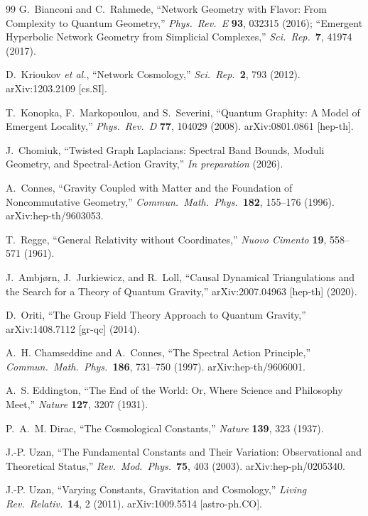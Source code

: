 \documentclass[11pt,a4paper]{article}
\theoremstyle{plain}
\theoremstyle{definition}
\begin{document}
\begin{thebibliography}{99}
G.~Bianconi and C.~Rahmede, ``Network Geometry with Flavor: From Complexity to Quantum Geometry,'' \textit{Phys.\ Rev.\ E} \textbf{93}, 032315 (2016); ``Emergent Hyperbolic Network Geometry from Simplicial Complexes,'' \textit{Sci.\ Rep.}\ \textbf{7}, 41974 (2017).

D.~Krioukov \textit{et al.}, ``Network Cosmology,'' \textit{Sci.\ Rep.}\ \textbf{2}, 793 (2012). arXiv:1203.2109 [cs.SI].

T.~Konopka, F.~Markopoulou, and S.~Severini, ``Quantum Graphity: A Model of Emergent Locality,'' \textit{Phys.\ Rev.\ D} \textbf{77}, 104029 (2008). arXiv:0801.0861 [hep-th].

J.~Chomiuk, ``Twisted Graph Laplacians: Spectral Band Bounds, Moduli Geometry, and Spectral-Action Gravity,'' \textit{In preparation} (2026).

A.~Connes, ``Gravity Coupled with Matter and the Foundation of Noncommutative Geometry,'' \textit{Commun.\ Math.\ Phys.}\ \textbf{182}, 155--176 (1996). arXiv:hep-th/9603053.

T.~Regge, ``General Relativity without Coordinates,'' \textit{Nuovo Cimento} \textbf{19}, 558--571 (1961).

J.~Ambj\o rn, J.~Jurkiewicz, and R.~Loll, ``Causal Dynamical Triangulations and the Search for a Theory of Quantum Gravity,'' arXiv:2007.04963 [hep-th] (2020).

D.~Oriti, ``The Group Field Theory Approach to Quantum Gravity,'' arXiv:1408.7112 [gr-qc] (2014).

A.~H. Chamseddine and A.~Connes, ``The Spectral Action Principle,'' \textit{Commun.\ Math.\ Phys.}\ \textbf{186}, 731--750 (1997). arXiv:hep-th/9606001.

A.~S. Eddington, ``The End of the World: Or, Where Science and Philosophy Meet,'' \textit{Nature} \textbf{127}, 3207 (1931).

P.~A.~M. Dirac, ``The Cosmological Constants,'' \textit{Nature} \textbf{139}, 323 (1937).

J.-P. Uzan, ``The Fundamental Constants and Their Variation: Observational and Theoretical Status,'' \textit{Rev.\ Mod.\ Phys.}\ \textbf{75}, 403 (2003). arXiv:hep-ph/0205340.

J.-P. Uzan, ``Varying Constants, Gravitation and Cosmology,'' \textit{Living Rev.\ Relativ.}\ \textbf{14}, 2 (2011). arXiv:1009.5514 [astro-ph.CO].

\end{thebibliography}
\end{document}

